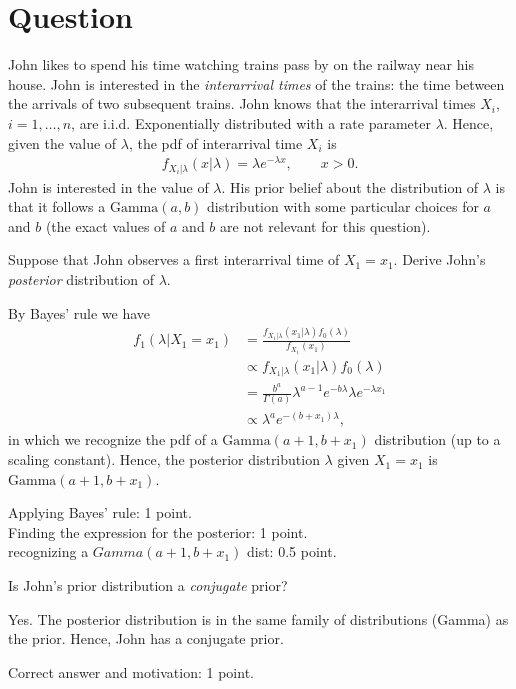 \section*{Question}


John likes to spend his time watching trains pass by on the railway near his house. John is interested in the \textit{interarrival times} of the trains: the time between the arrivals of two subsequent trains. John knows that the interarrival times $X_i$, $i=1,\ldots,n$, are i.i.d. Exponentially distributed with a rate parameter $\lambda$. Hence, given the value of $\lambda$, the pdf of interarrival time $X_i$ is
\begin{align}
    f_{X_i|\lambda}(x|\lambda) = \lambda e^{-\lambda x}, \qquad x > 0.
\end{align}
John is interested in the value of $\lambda$. His prior belief about the distribution of $\lambda$ is that it follows a $\text{Gamma}(a,b)$ distribution with some particular choices for $a$ and $b$ (the exact values of $a$ and $b$ are not relevant for this question).

\begin{exercise}[2.5]
Suppose that John observes a first interarrival time of $X_1 = x_1$. Derive John's \textit{posterior} distribution of $\lambda$.
\begin{solution}
By Bayes' rule we have
\begin{align}
    f_1(\lambda|X_1 = x_1) &= \frac{f_{X_1|\lambda}(x_1|\lambda) f_0(\lambda)}{f_{X_1}(x_1)} \\
    &\propto f_{X_1|\lambda}(x_1|\lambda) f_0(\lambda) \\
    &= \frac{b^a}{\Gamma(a)}\lambda^{a-1} e^{-b\lambda} \lambda e^{-\lambda x_1} \\
    &\propto \lambda^{a} e^{-(b + x_1)\lambda},
\end{align}
in which we recognize the pdf of a $\text{Gamma}(a+1,b+x_1)$ distribution (up to a scaling constant). Hence, the posterior distribution $\lambda$ given $X_1 = x_1$ is $\text{Gamma}(a+1,b+x_1)$.

Applying Bayes' rule: 1 point.\\
Finding the expression for the posterior: 1 point.\\
recognizing a $Gamma(a+1,b+x_1)$ dist: 0.5 point.
\end{solution}
\end{exercise}

\begin{exercise}[1]
Is John's prior distribution a \textit{conjugate} prior?
\begin{solution}
Yes. The posterior distribution is in the same family of distributions  (Gamma) as the prior. Hence, John has a conjugate prior.

Correct answer and motivation: 1 point.
\end{solution}
\end{exercise}

